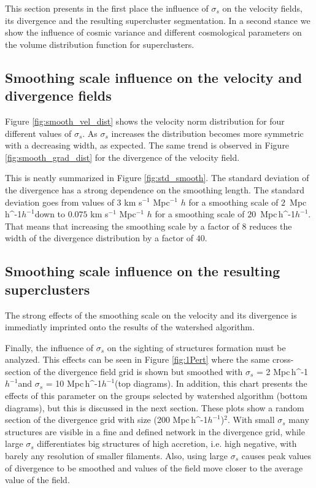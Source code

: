 \documentclass[usenatbib]{mnras}
\newcommand{\Mpch}{\,{\rm Mpc}\,\ifmmode h^{-1}\else $h^{-1}$\fi}
\begin{document}
This section presents in the first place the influence of $\sigma_s$
on the velocity fields, its divergence and the resulting supercluster
segmentation. 
In a second stance we show the influence of cosmic variance and
different cosmological parameters on the volume distribution function
for superclusters. 

\subsection{Smoothing scale influence on the velocity and divergence fields}
\label{VDF effects}

Figure \ref{fig:smooth_vel_dist} shows the velocity norm distribution
for four different values of $\sigma_s$. 
As $\sigma_s$ increases the distribution becomes more symmetric with a
decreasing width, as expected.
The same trend is observed in Figure \ref{fig:smooth_grad_dist} for
the divergence of the velocity field.

This is neatly summarized in  Figure \ref{fig:std_smooth}.
The standard deviation of the divergence has a strong dependence on
the smoothing length.
The standard deviation goes from values of $3$  km s$^{-1}$ Mpc$^{-1}$ $h$ 
for a smoothing scale of $2$ \Mpch down to $0.075$ km s$^{-1}$
Mpc$^{-1}$ $h$ for a smoothing scale of $20$ \Mpch.
That means that increasing the smoothing scale by a factor of $8$
reduces the width of the divergence distribution by a factor of
$40$. 

\subsection{Smoothing scale influence on the resulting superclusters}
\label{sec:superclusters_influence}

The strong effects of the smoothing scale on the velocity and its
divergence is immediatly imprinted onto the results of the watershed
algorithm.


Finally, the influence of $\sigma_s$ on the sighting of structures
formation must be analyzed. This effects can be seen in Figure
\ref{fig:1Pert} where the same cross-section of the divergence field
grid is shown but smoothed with $\sigma_s$ = 2\,\Mpch and $\sigma_s$ =
10\,\Mpch (top diagrams). In addition, this chart presents the effects
of this parameter on the groups selected by watershed algorithm
(bottom diagrams), but this is discussed in the next section. These
plots show a random section of the divergence grid with size
(200\,\Mpch)$^2$. With small $\sigma_{s}$ many structures are visible
in a fine and defined network in the divergence grid, while large
$\sigma_{s}$ differentiates big structures of high accretion,
i.e. high negative, with barely any resolution of smaller
filaments. Also, using large $\sigma_{s}$ causes peak values of
divergence to be smoothed and values of the field move closer to  the
average value of the field.  
\end{document}
